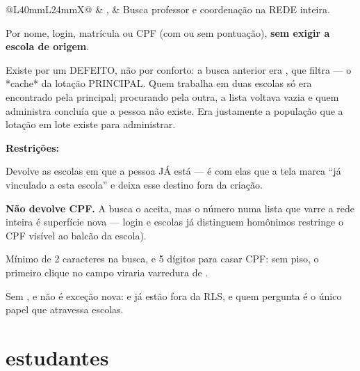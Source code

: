 \begin{tabularx}{\linewidth}{@{}L{40mm}L{24mm}X@{}}
 & ,  & Busca professor e coordenação na REDE inteira.\par Por nome, login, matrícula ou CPF (com ou sem pontuação), \textbf{sem exigir a escola de origem}.\par Existe por um DEFEITO, não por conforto: a busca anterior era , que filtra  --- o *cache* da lotação PRINCIPAL. Quem trabalha em duas escolas só era encontrado pela principal; procurando pela outra, a lista voltava vazia e quem administra concluía que a pessoa não existe. Era justamente a população que a lotação em lote existe para administrar.\par \textbf{Restrições:}\par \hspace*{1em}\textbullet{} Devolve as escolas em que a pessoa JÁ está --- é com elas que a tela marca \enquote{já vinculado a esta escola} e deixa esse destino fora da criação.\par \hspace*{1em}\textbullet{} \textbf{Não devolve CPF.} A busca o aceita, mas o número numa lista que varre a rede inteira é superfície nova --- login e escolas já distinguem homônimos  restringe o CPF visível ao balcão da escola).\par \hspace*{1em}\textbullet{} Mínimo de 2 caracteres na busca, e 5 dígitos para casar CPF: sem piso, o primeiro clique no campo viraria varredura de .\par \hspace*{1em}\textbullet{} Sem , e não é exceção nova:  e  já estão fora da RLS, e quem pergunta é o único papel que atravessa escolas.\\
\bottomrule
\end{tabularx}

\section{estudantes}

